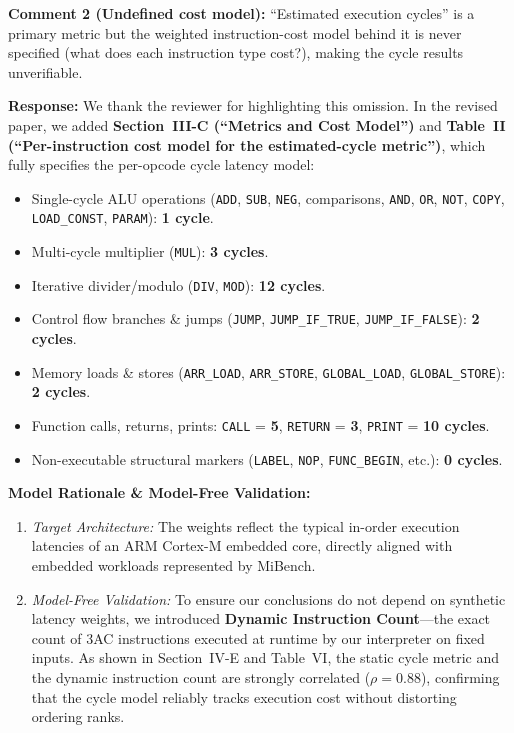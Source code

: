 \documentclass[10pt,a4paper]{article}
\begin{document}
\vspace{0.8em}
\begin{reviewercomment}
\textbf{Comment 2 (Undefined cost model):} ``Estimated execution cycles'' is a primary metric but the weighted instruction-cost model behind it is never specified (what does each instruction type cost?), making the cycle results unverifiable.
\end{reviewercomment}

\noindent \textbf{Response:} We thank the reviewer for highlighting this omission. In the revised paper, we added \textbf{Section~III-C (``Metrics and Cost Model'')} and \textbf{Table~II (``Per-instruction cost model for the estimated-cycle metric'')}, which fully specifies the per-opcode cycle latency model:
\begin{itemize}[itemsep=1pt,parsep=0pt,topsep=2pt]
    \item Single-cycle ALU operations (\texttt{ADD}, \texttt{SUB}, \texttt{NEG}, comparisons, \texttt{AND}, \texttt{OR}, \texttt{NOT}, \texttt{COPY}, \texttt{LOAD\_CONST}, \texttt{PARAM}): \textbf{1 cycle}.
    \item Multi-cycle multiplier (\texttt{MUL}): \textbf{3 cycles}.
    \item Iterative divider/modulo (\texttt{DIV}, \texttt{MOD}): \textbf{12 cycles}.
    \item Control flow branches \& jumps (\texttt{JUMP}, \texttt{JUMP\_IF\_TRUE}, \texttt{JUMP\_IF\_FALSE}): \textbf{2 cycles}.
    \item Memory loads \& stores (\texttt{ARR\_LOAD}, \texttt{ARR\_STORE}, \texttt{GLOBAL\_LOAD}, \texttt{GLOBAL\_STORE}): \textbf{2 cycles}.
    \item Function calls, returns, prints: \texttt{CALL} = \textbf{5}, \texttt{RETURN} = \textbf{3}, \texttt{PRINT} = \textbf{10 cycles}.
    \item Non-executable structural markers (\texttt{LABEL}, \texttt{NOP}, \texttt{FUNC\_BEGIN}, etc.): \textbf{0 cycles}.
\end{itemize}
\textbf{Model Rationale \& Model-Free Validation:}
\begin{enumerate}[itemsep=1pt,parsep=0pt,topsep=2pt]
    \item \textit{Target Architecture:} The weights reflect the typical in-order execution latencies of an ARM Cortex-M embedded core, directly aligned with embedded workloads represented by MiBench.
    \item \textit{Model-Free Validation:} To ensure our conclusions do not depend on synthetic latency weights, we introduced \textbf{Dynamic Instruction Count}---the exact count of 3AC instructions executed at runtime by our interpreter on fixed inputs. As shown in Section~IV-E and Table~VI, the static cycle metric and the dynamic instruction count are strongly correlated ($\rho = 0.88$), confirming that the cycle model reliably tracks execution cost without distorting ordering ranks.
\end{enumerate}
\end{document}
